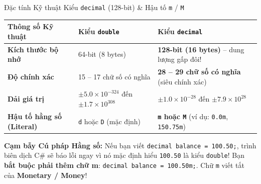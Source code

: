 \documentclass[aspectratio=169, 10pt]{beamer}
\begin{document}
\begin{frame}{Đặc tính Kỹ thuật Kiểu \texttt{decimal} (128-bit) \& Hậu tố \texttt{m} / \texttt{M}}
  \begin{table}
    \centering\small
    \begin{tabularx}{\textwidth}{lXX}
      \toprule
      \textbf{Thông số Kỹ thuật} & \textbf{Kiểu \texttt{double}} & \textbf{Kiểu \texttt{decimal}} \\
      \midrule
      \textbf{Kích thước bộ nhớ} & 64-bit (8 bytes) & \textbf{128-bit (16 bytes)} -- dung lượng gấp đôi! \\
      \textbf{Độ chính xác} & 15 -- 17 chữ số có nghĩa & \textbf{28 -- 29 chữ số có nghĩa} (siêu chính xác) \\
      \textbf{Dải giá trị} & $\pm 5.0 \times 10^{-324}$ đến $\pm 1.7 \times 10^{308}$ & $\pm 1.0 \times 10^{-28}$ đến $\pm 7.9 \times 10^{28}$ \\
      \textbf{Hậu tố hằng số (Literal)} & \texttt{d} hoặc \texttt{D} (mặc định) & \textbf{\texttt{m} hoặc \texttt{M}} (ví dụ: \texttt{0.0m}, \texttt{150.75m}) \\
      \bottomrule
    \end{tabularx}
  \end{table}
  \vspace{2mm}
  \begin{alertblock}{\textbf{Cạm bẫy Cú pháp Hằng số:}}
    Nếu bạn viết \texttt{decimal balance = 100.50;}, trình biên dịch C\# sẽ báo lỗi ngay vì nó mặc định hiểu \texttt{100.50} là kiểu \texttt{double}! Bạn \textbf{bắt buộc phải thêm chữ m}: \texttt{decimal balance = 100.50m;}. Chữ \texttt{m} viết tắt của \textbf{Monetary / Money}!
  \end{alertblock}
\end{frame}
\end{document}
